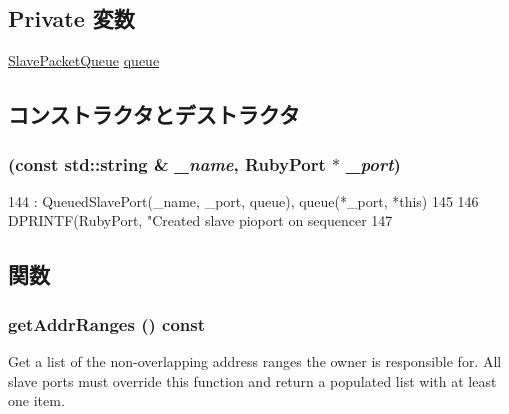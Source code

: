 \subsection*{Private 変数}
\begin{DoxyCompactItemize}
\item 
\hyperlink{classSlavePacketQueue}{SlavePacketQueue} \hyperlink{classRubyPort_1_1PioSlavePort_a3055168363a9ed42f38173363b6c1975}{queue}
\end{DoxyCompactItemize}


\subsection{コンストラクタとデストラクタ}
\hypertarget{classRubyPort_1_1PioSlavePort_a3677965c763257796db6fbea6765c6c5}{
\subsubsection[{PioSlavePort}]{ (const std::string \& {\em \_\-name}, \/  {\bf RubyPort} $\ast$ {\em \_\-port})}}
\label{classRubyPort_1_1PioSlavePort_a3677965c763257796db6fbea6765c6c5}



\begin{DoxyCode}
144     : QueuedSlavePort(_name, _port, queue), queue(*_port, *this)
145 {
146     DPRINTF(RubyPort, "Created slave pioport on sequencer %
147 }
\end{DoxyCode}


\subsection{関数}
\hypertarget{classRubyPort_1_1PioSlavePort_a36cf113d5e5e091ebddb32306c098fae}{
\subsubsection[{getAddrRanges}]{ getAddrRanges () const}}
\label{classRubyPort_1_1PioSlavePort_a36cf113d5e5e091ebddb32306c098fae}
Get a list of the non-\/overlapping address ranges the owner is responsible for. All slave ports must override this function and return a populated list with at least one item.

